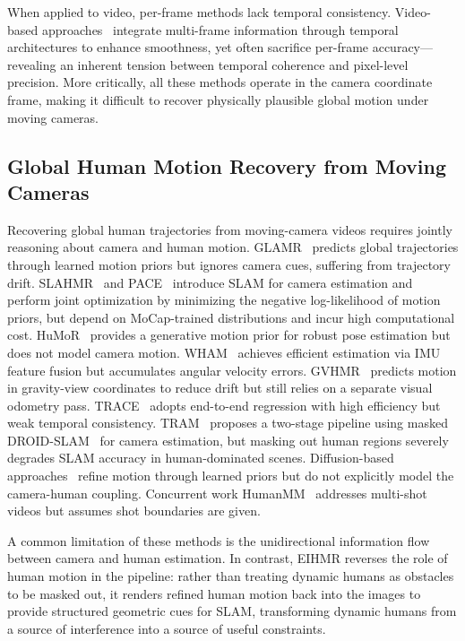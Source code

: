 When applied to video, per-frame methods lack temporal consistency. Video-based approaches~\cite{TCMR2021,MPSNet2022} integrate multi-frame information through temporal architectures to enhance smoothness, yet often sacrifice per-frame accuracy---revealing an inherent tension between temporal coherence and pixel-level precision. More critically, all these methods operate in the camera coordinate frame, making it difficult to recover physically plausible global motion under moving cameras.

\subsection{Global Human Motion Recovery from Moving Cameras}

Recovering global human trajectories from moving-camera videos requires jointly reasoning about camera and human motion. GLAMR~\cite{GLAMR2022} predicts global trajectories through learned motion priors but ignores camera cues, suffering from trajectory drift. SLAHMR~\cite{SLAHMR2023} and PACE~\cite{PACE2024} introduce SLAM for camera estimation and perform joint optimization by minimizing the negative log-likelihood of motion priors, but depend on MoCap-trained distributions and incur high computational cost. HuMoR~\cite{HuMoR2022} provides a generative motion prior for robust pose estimation but does not model camera motion. WHAM~\cite{WHAM2024} achieves efficient estimation via IMU feature fusion but accumulates angular velocity errors. GVHMR~\cite{GVHMR2024} predicts motion in gravity-view coordinates to reduce drift but still relies on a separate visual odometry pass. TRACE~\cite{TRACE2023} adopts end-to-end regression with high efficiency but weak temporal consistency. TRAM~\cite{TRAM2024} proposes a two-stage pipeline using masked DROID-SLAM~\cite{DROIDSLAM2021} for camera estimation, but masking out human regions severely degrades SLAM accuracy in human-dominated scenes. Diffusion-based approaches~\cite{RoHM2024,PhysDiff2023} refine motion through learned priors but do not explicitly model the camera-human coupling. Concurrent work HumanMM~\cite{HumanMM2025} addresses multi-shot videos but assumes shot boundaries are given.

A common limitation of these methods is the unidirectional information flow between camera and human estimation. In contrast, EIHMR reverses the role of human motion in the pipeline: rather than treating dynamic humans as obstacles to be masked out, it renders refined human motion back into the images to provide structured geometric cues for SLAM, transforming dynamic humans from a source of interference into a source of useful constraints.


